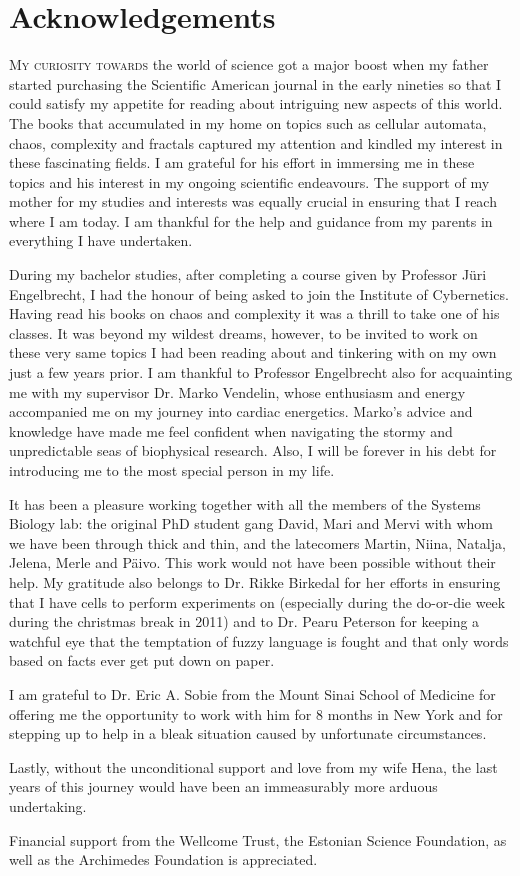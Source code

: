 \chapter*{Acknowledgements} \lettrine[lines=2, lhang=0.33,
loversize=0.25]{M}{y curiosity towards} the world of science got a major boost when my
father started purchasing the Scientific American journal in the early
nineties so that I could satisfy my
appetite for reading about intriguing new aspects of this world. The books that accumulated in my home on topics such as cellular automata, chaos,
complexity and fractals captured my attention and kindled my interest in
these fascinating fields. I am grateful for his effort in immersing me in
these topics and his interest in my ongoing scientific endeavours. The
support of my mother for my studies and interests was equally crucial in
ensuring that I reach where I am today. I am thankful for the help and
guidance from my parents in everything I have undertaken.

During my bachelor studies, after completing a course given by Professor Jüri
Engel\-brecht, I had the honour of being asked to join the
Institute of Cybernetics. Having read his books on chaos and complexity
it was a thrill to take one of his classes. It was beyond my wildest
dreams, however, to be invited to work on these very same topics I had
been reading about and tinkering with on my own just a few years prior.
I am thankful to Professor Engelbrecht also for acquainting me with my
supervisor Dr. Marko Vendelin, whose enthusiasm and energy accompanied
me on my journey into cardiac energetics. Marko's advice and knowledge have
made me feel confident when navigating the stormy and unpredictable seas
of biophysical research. Also, I will be forever in his debt for
introducing me to the most special person in my life.

It has been a pleasure working together with all the members of the
Systems Biology lab: the original PhD student gang David, Mari and Mervi
with whom we have been through thick and thin, and the latecomers Martin,
Niina, Na\-talja, Jelena, Merle and Päivo. This work
would not have been possible without their help. My gratitude also belongs to Dr. Rikke
Birkedal for her efforts in ensuring that I have cells to perform
experiments on (especially during the do-or-die week during the
christmas break in 2011) and to Dr. Pearu Peterson for keeping a
watchful eye that the temptation of fuzzy language is fought and that
only words based on facts ever get put down on paper. 

I am grateful to Dr. Eric A. Sobie from the Mount Sinai School of
Medicine for offering me the opportunity to work with him for 8
months in New York and for stepping up to help in a bleak
situation caused by unfortunate circumstances. 

Lastly, without the unconditional support and love from my wife Hena, the
last years of this journey would have been an immeasurably more arduous
undertaking.  

Financial support from the Wellcome Trust, the Estonian Science Foundation, as
well as the Archimedes Foundation is appreciated.
